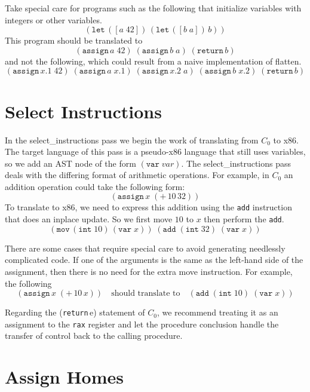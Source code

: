 \documentclass[12pt]{book}
\newcommand{\itm}[1]{\ensuremath{\mathit{#1}}}
\newcommand{\key}[1]{\texttt{#1}}
\newcommand{\BINOP}[3]{(\key{#1}\,#2\,#3)}
\newcommand{\LET}[3]{(\key{let}\,([#1\;#2])\,#3)}
\newcommand{\ASSIGN}[2]{(\key{assign}\,#1\;#2)}
\newcommand{\RETURN}[1]{(\key{return}\,#1)}
\newcommand{\INT}[1]{(\key{int}\;#1)}
\newcommand{\VAR}[1]{(\key{var}\;#1)}
\begin{document}
Take special care for programs such as the following that initialize
variables with integers or other variables.
\[
\LET{a}{42}{ \LET{b}{a}{ b }}
\]
This program should be translated to 
\[
\ASSIGN{a}{42} \;
\ASSIGN{b}{a} \;
\RETURN{b}
\]
and not the following, which could result from a naive implementation
of \textsf{flatten}.
\[
\ASSIGN{x.1}{42}\;
\ASSIGN{a}{x.1}\;
\ASSIGN{x.2}{a}\;
\ASSIGN{b}{x.2}\;
\RETURN{b}
\]

\section{Select Instructions}

In the \textsf{select\_instructions} pass we begin the work of
translating from $C_0$ to x86. The target language of this pass is a
pseudo-x86 language that still uses variables, so we add an AST node
of the form $\VAR{\itm{var}}$.  The \textsf{select\_instructions} pass
deals with the differing format of arithmetic operations. For example,
in $C_0$ an addition operation could take the following form:
\[
\ASSIGN{x}{ \BINOP{+}{10}{32} }
\]
To translate to x86, we need to express this addition using the
\key{add} instruction that does an inplace update. So we first move
$10$ to $x$ then perform the \key{add}.
\[
(\key{mov}\,\INT{10}\, \VAR{x})\; (\key{add} \;\INT{32}\; \VAR{x})
\]

There are some cases that require special care to avoid generating
needlessly complicated code. If one of the arguments is the same as
the left-hand side of the assignment, then there is no need for the
extra move instruction.  For example, the following
\[
\ASSIGN{x}{ \BINOP{+}{10}{x} }
\quad\text{should translate to}\quad
(\key{add} \; \INT{10}\; \VAR{x})
\]

Regarding the \RETURN{e} statement of $C_0$, we recommend treating it
as an assignment to the \key{rax} register and let the procedure
conclusion handle the transfer of control back to the calling
procedure.

\section{Assign Homes}
\end{document}
